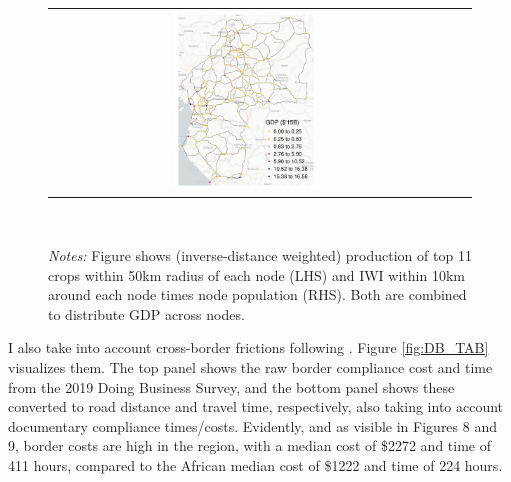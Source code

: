 \documentclass[a4paper]{article}
\begin{document}
\begin{figure}[H]
{\begin{tabular}{@{}c@{}c@{}@{}c@{}}
\includegraphics[width=0.38\textwidth, trim= {7mm 0 7mm 0}, clip]{"../figures/trans_CEMAC_network_GDP.pdf"}
\end{tabular}
}
\\\vspace{-2mm}
\raggedright
\scriptsize 
\emph{Notes:} Figure shows (inverse-distance weighted) production of top 11 crops within 50km radius of each node (LHS) and IWI within 10km around each node times node population (RHS). Both are combined to distribute GDP across nodes. \vspace{-5mm}
\end{figure}
  
I also take into account cross-border frictions following \citet{krantz2024optimal}. Figure \ref{fig:DB_TAB} visualizes them. The top panel shows the raw border compliance cost and time from the 2019 Doing Business Survey, and the bottom panel shows these converted to road distance and travel time, respectively, also taking into account documentary compliance times/costs. Evidently, and as visible in \citet{krantz2024optimal} Figures 8 and 9, border costs are high in the region, with a median cost of \$2272 and time of 411 hours, compared to the African median cost of \$1222 and time of 224 hours. 


  
  
\end{document}
